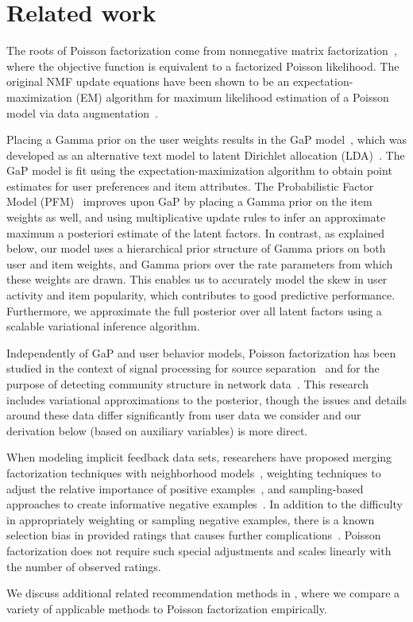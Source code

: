 \section{Related work}
The roots of Poisson factorization come from nonnegative matrix
factorization~\cite{Lee:1999}, where the objective function is
equivalent to a factorized Poisson likelihood.  The original NMF
update equations have been shown to be an expectation-maximization
(EM) algorithm for maximum likelihood estimation of a Poisson model
via data augmentation~\cite{Cemgil:2009}.

Placing a Gamma prior on the user weights results in the GaP
model~\cite{Canny:2004}, which was developed as an alternative text
model to latent Dirichlet allocation
(LDA)~\cite{Blei:2003b,Inouye:2014}. The GaP model is fit using the
expectation-maximization algorithm to obtain point estimates for user
preferences and item attributes. The Probabilistic Factor Model
(PFM)~\cite{Ma:2011} improves upon GaP by placing a Gamma prior on the
item weights as well, and using multiplicative update rules to infer
an approximate maximum a posteriori estimate of the latent factors.
In contrast, as explained below, our model uses a hierarchical prior
structure of Gamma priors on both user and item weights, and Gamma
priors over the rate parameters from which these weights are
drawn. This enables us to accurately model the skew in user activity
and item popularity, which contributes to good predictive
performance. Furthermore, we approximate the full posterior over all
latent factors using a scalable variational inference algorithm.

Independently of GaP and user behavior models, Poisson factorization
has been studied in the context of signal processing for source
separation~\cite{Cemgil:2009,Hoffman:2012} and for the purpose of
detecting community structure in network
data~\cite{Ball:2011,Gopalan:2013}. This research includes variational
approximations to the posterior, though the issues and details around
these data differ significantly from user data we consider and our
derivation below (based on auxiliary variables) is more direct.

When modeling implicit feedback data sets, researchers have proposed
merging factorization techniques with neighborhood
models~\cite{Koren:2008}, weighting techniques to adjust the relative
importance of positive examples~\cite{Hu:2008p9402}, and
sampling-based approaches to create informative negative
examples~\cite{Gantner:2012p9364,Dror:2012a,Paquet:2013p9197}.  In
addition to the difficulty in appropriately weighting or sampling
negative examples, there is a known selection bias in provided ratings
that causes further complications~\cite{Marlin:2009,Marlin:2012}.
Poisson factorization does not require such special adjustments and
scales linearly with the number of observed ratings.

We discuss additional related recommendation methods in
, where we compare a variety of applicable methods to
Poisson factorization empirically.

